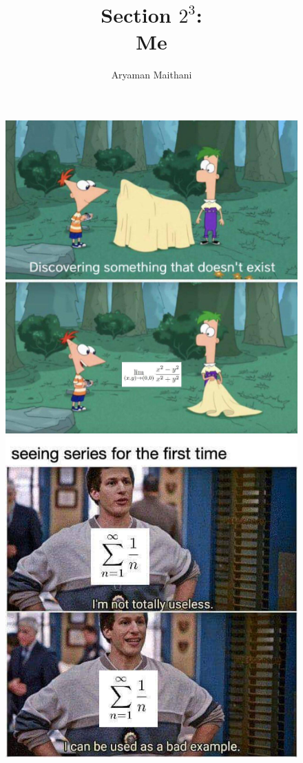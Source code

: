 \documentclass[handout, aspectratio=169]{beamer}
\begin{document}
\begin{frame} 
	\begin{figure}[t]
		\begin{minipage}{0.48\textwidth}
			\centering
			\includegraphics[width=7.5 cm]{25.png}
			
		\end{minipage}
		\begin{minipage}{0.48\textwidth}
			\centering
			\includegraphics[width=5 cm]{18.jpg}
			
		\end{minipage}
	\end{figure}
\end{frame}
\author{ }
\title{Section $2^3$:\\ Me}
\begin{frame} 
	\titlepage
\end{frame}
\author{Aryaman Maithani}
\end{document}
